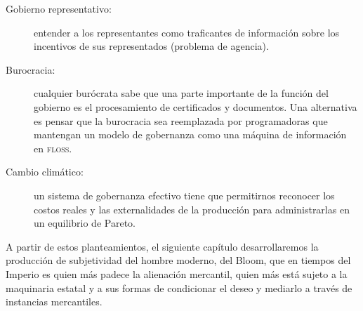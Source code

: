 \begin{description}
  \item[Gobierno representativo:] entender a los representantes como traficantes de información sobre los incentivos de sus representados (problema de agencia).
  \item[Burocracia:] cualquier burócrata sabe que una parte importante de la función del gobierno es el procesamiento de certificados y documentos. Una alternativa es pensar que la burocracia sea reemplazada por programadoras que mantengan un modelo de gobernanza como una máquina de información en \textsc{floss}.
  \item[Cambio climático:] un sistema de gobernanza efectivo tiene que permitirnos reconocer los costos reales y las externalidades de la producción para administrarlas en un equilibrio de Pareto.
\end{description}

A partir de estos planteamientos, el siguiente capítulo desarrollaremos la producción de subjetividad del hombre moderno, del Bloom, que en tiempos del Imperio es quien más padece la alienación mercantil, quien más está sujeto a la maquinaria estatal y a sus formas de condicionar el deseo y mediarlo a través de instancias mercantiles.